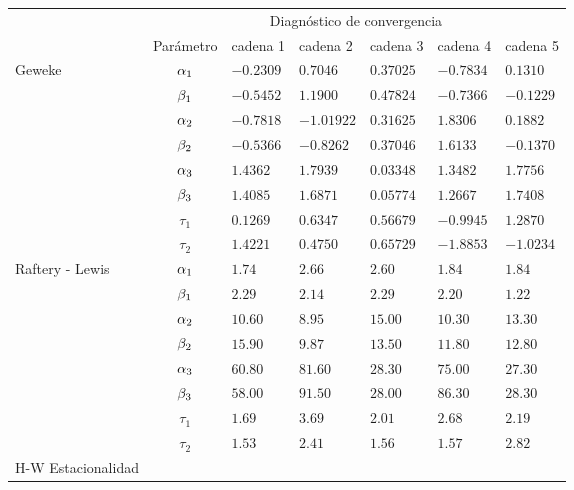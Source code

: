 

\begin{table}[!h]
\centering
\begin{tabular}{|l|c|l|l|l|l|l|}
\hline
& \multicolumn{6}{|c|}{Diagnóstico de convergencia} \\
\cline{2-7}
& Parámetro & cadena 1  & cadena 2  & cadena 3 & cadena 4 & cadena 5	 \\
\hline \hline

\multirow{8}{2.5cm}{Geweke}
& $\alpha_1$ & $ -0.2309 $ & $0.7046$ & $0.37025 $ & $ -0.7834$  & $  0.1310$\\ 
\cline{2-7}
& $\beta_1$& $-0.5452  $ & $1.1900$ & $0.47824$ & $-0.7366$ & $  -0.1229$\\
\cline{2-7}
& $\alpha_2$& $-0.7818  $ & $ -1.01922$ & $0.31625$ & $1.8306$ & $ 0.1882 $\\
\cline{2-7}
& $\beta_2$& $-0.5366 $ & $-0.8262 $ & $ 0.37046 $ & $1.6133$ & $-0.1370$\\
\cline{2-7}
& $\alpha_3$& $1.4362  $ & $1.7939$ & $0.03348$ & $ 1.3482$ & $  1.7756  $\\
\cline{2-7}
& $\beta_3$& $1.4085$ & $1.6871$ & $0.05774$& $1.2667$ & $1.7408$\\
\cline{2-7}
& $\tau_1$& $0.1269  $ & $0.6347$ & $0.56679$ & $ -0.9945$ & $ 1.2870$\\
\cline{2-7}
& $\tau_2 $& $1.4221 $ & $0.4750 $ & $0.65729$ & $ -1.8853$ & $ -1.0234$\\
\cline{1-7}
                  
\multirow{8}{2.5cm}{Raftery - Lewis} 
& $\alpha_1$ & $1.74  $ & $2.66 $ & $2.60 $ & $1.84$  & $ 1.84$\\ 
\cline{2-7}
& $\beta_1$& $2.29 $ & $ 2.14 $ & $2.29$ & $2.20$ & $ 1.22 $\\
\cline{2-7}
& $\alpha_2$ & $ 10.60 $ & $8.95 $ & $15.00$ & $ 10.30$ & $13.30 $\\
\cline{2-7}
& $\beta_2$ & $  15.90  $ & $9.87  $ & $13.50$ & $11.80$ & $  12.80 $\\
\cline{2-7}
& $\alpha_3$ & $ 60.80 $ & $ 81.60$ & $ 28.30$ & $75.00 $ & $27.30$\\
\cline{2-7}
& $\beta_3$ & $58.00 $ & $ 91.50 $ & $28.00$ & $86.30$ & $ 28.30$\\
\cline{2-7}
& $\tau_1$& $ 1.69 $ & $3.69  $ & $2.01$ & $ 2.68 $ & $2.19$\\
\cline{2-7}
& $\tau_2 $& $1.53 $ & $2.41$ & $ 1.56$ & $ 1.57$ & $ 2.82 $\\
\cline{1-7}
\multirow{8}{2.5cm}{H-W Estacionalidad} 


\end{tabular}
\end{table}
